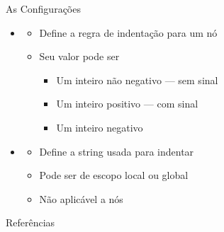 \documentclass
  [ aspectratio=169,
    english,
    hyperref={citecolor=blue,colorlinks=true,linkcolor=blue,urlcolor=blue},
    brazil]
  {beamer}
\begin{document}

  \begin{frame}[fragile]{As Configurações}
    \begin{itemize}
      \item {}
            \begin{itemize}
              \item Define a regra de indentação para um nó
              \item Seu valor pode ser
                    \begin{itemize}
                      \item Um inteiro não negativo --- sem sinal
                      \item Um inteiro positivo --- com sinal
                      \item Um inteiro negativo
                    \end{itemize}
            \end{itemize}
      \item {}
            \begin{itemize}
              \item Define a string usada para indentar
              \item Pode ser de escopo local ou global
              \item Não aplicável a nós
            \end{itemize}
    \end{itemize}
  \end{frame}


  \begin{frame}[allowframebreaks]{Referências}\printbibliography\end{frame}
\end{document}
